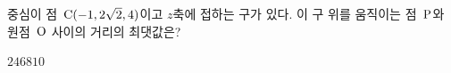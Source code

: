 중심이 점~$\mathrm{C}(-1{,}\mkern3mu\mathopen{}2\sqrt{2}{,}\mkern3mu\mathopen{}4)$이고 $z$축에 접하는 구가 있다. 이 구 위를 움직이는 점~$\mathrm{P}$와 원점~$\mathrm{O}$ 사이의 거리의 최댓값은?
\begin{choices32}{$2$}{$4$}{$6$}{$8$}{$10$}\end{choices32}
